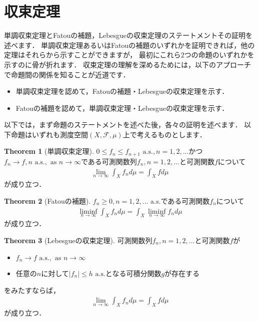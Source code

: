 \documentclass[a4paper,10pt]{jsarticle}
\theoremstyle{definition}
\newtheorem{theorem}{Theorem}
\newcommand{\eq}[1]{\begin{align}#1\end{align}}
\newcommand{\items}[1]{\begin{itemize}#1\end{itemize}}
\begin{document}
\section{収束定理}
単調収束定理とFatouの補題，Lebesgueの収束定理のステートメントその証明を述べます．
単調収束定理あるいはFatouの補題のいずれかを証明できれば，他の定理はそれらから示すことができますが，
最初にこれら$2$つの命題のいずれかを示すのに骨が折れます．
収束定理の理解を深めるためには，以下のアプローチで命題間の関係を知ることが近道です．
\items{
	\item 単調収束定理を認めて，Fatouの補題・Lebesgueの収束定理を示す．
	\item Fatouの補題を認めて，単調収束定理・Lebesgueの収束定理を示す．}
以下では，まず命題のステートメントを述べた後，各々の証明を述べます．
以下命題はいずれも測度空間$(X,\mathcal{F},\mu)$上で考えるものとします．

\begin{theorem}[単調収束定理]
$0\le f_n\le f_{n+1}\text{ a.s.}, n=1,2,...$かつ$f_n\rightarrow f,n\text{ a.s.},\text{ as }n\rightarrow\infty$である可測関数列$f_n,n=1,2,...$と可測関数$f$について
\eq{\lim_{n\rightarrow\infty}\int_X f_nd\mu=\int_Xfd\mu}
が成り立つ．
\end{theorem}\begin{theorem}[Fatouの補題]
$f_n\ge0,n=1,2,...\text{ a.s.}$である可測関数$f_n$について
\eq{\liminf_{n\rightarrow\infty}\int_Xf_nd\mu=\int_X\liminf_{n\rightarrow\infty}f_nd\mu}
が成り立つ．
\end{theorem}\begin{theorem}[Lebesgueの収束定理]
可測関数列$f_n,n=1,2,...$と可測関数$f$が
\items{
	\item $f_n\rightarrow f\text{ a.s.},\text{ as }n\rightarrow\infty$
	\item 任意の$n$に対して$|f_n|\le h\text{ a.s.}$となる可積分関数$g$が存在する}
をみたすならば，
\eq{\lim_{n\rightarrow\infty}\int_X f_nd\mu=\int_Xfd\mu}
が成り立つ．
\end{theorem}
\end{document}

